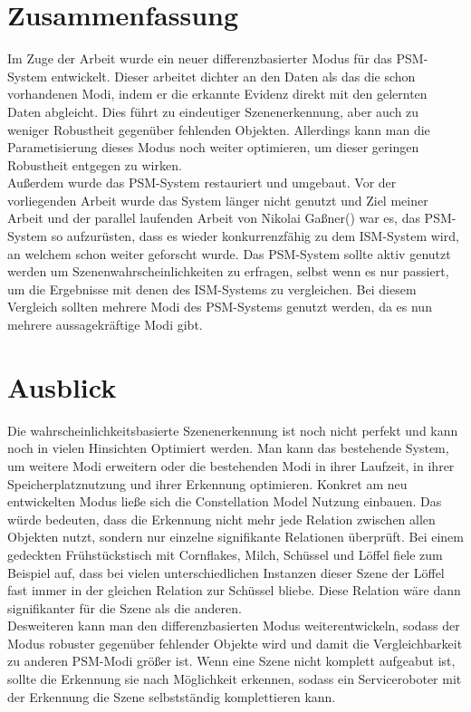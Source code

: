 \section{Zusammenfassung}
Im Zuge der Arbeit wurde ein neuer differenzbasierter Modus für das PSM-System entwickelt. Dieser arbeitet dichter an den Daten als das die schon vorhandenen Modi, indem er die erkannte Evidenz direkt mit den gelernten Daten abgleicht. Dies führt zu eindeutiger Szenenerkennung, aber auch zu weniger Robustheit gegenüber fehlenden Objekten. Allerdings kann man die Parametisierung dieses Modus noch weiter optimieren, um dieser geringen Robustheit entgegen zu wirken.\smallskip\\
Außerdem wurde das PSM-System restauriert und umgebaut. Vor der vorliegenden Arbeit wurde das System länger nicht genutzt und Ziel meiner Arbeit und der parallel laufenden Arbeit von Nikolai Gaßner(\cite{gassner17}) war es, das PSM-System so aufzurüsten, dass es wieder konkurrenzfähig zu dem ISM-System wird, an welchem schon weiter geforscht wurde. Das PSM-System sollte aktiv genutzt werden um Szenenwahrscheinlichkeiten zu erfragen, selbst wenn es nur passiert, um die Ergebnisse mit denen des ISM-Systems zu vergleichen. Bei diesem Vergleich sollten mehrere Modi des PSM-Systems genutzt werden, da es nun mehrere aussagekräftige Modi gibt.\smallskip\\
\section{Ausblick}
Die wahrscheinlichkeitsbasierte Szenenerkennung ist noch nicht perfekt und kann noch in vielen Hinsichten Optimiert werden. Man kann das bestehende System, um weitere Modi erweitern oder die bestehenden Modi in ihrer Laufzeit, in ihrer Speicherplatznutzung und ihrer Erkennung optimieren. Konkret am neu entwickelten Modus ließe sich die Constellation Model Nutzung einbauen. Das würde bedeuten, dass die Erkennung nicht mehr jede Relation zwischen allen Objekten nutzt, sondern nur einzelne signifikante Relationen überprüft. Bei einem gedeckten Frühstückstisch mit Cornflakes, Milch, Schüssel und Löffel fiele zum Beispiel auf, dass bei vielen unterschiedlichen Instanzen dieser Szene der Löffel fast immer in der gleichen Relation zur Schüssel bliebe. Diese Relation wäre dann signifikanter für die Szene als die anderen.\smallskip\\
Desweiteren kann man den differenzbasierten Modus weiterentwickeln, sodass der Modus robuster gegenüber fehlender Objekte wird und damit die Vergleichbarkeit zu anderen PSM-Modi größer ist. Wenn eine Szene nicht komplett aufgeabut ist, sollte die Erkennung sie nach Möglichkeit erkennen, sodass ein Serviceroboter mit der Erkennung die Szene selbstständig komplettieren kann.